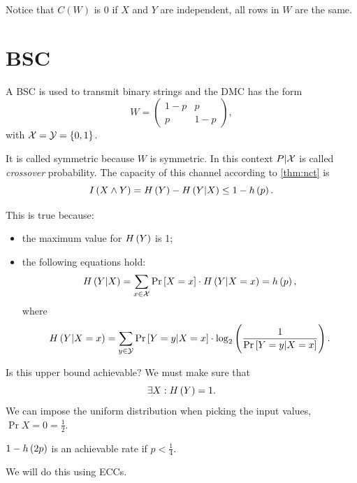 Notice that $C(W)$ is 0 if $X$ and $Y$ are independent, \ie all rows in $W$ are the same. 

\section{\acl{BSC}}

A \ac{BSC} is used to transmit binary strings and the \ac{DMC} has the form
\begin{equation*}
	W = 
	\begin{pmatrix}
		1-p & p \\
		p & 1-p
	\end{pmatrix},
\end{equation*}
with $\mathcal{X} = \mathcal{Y} = \{0,1\}$.

It is called symmetric because $W$ is symmetric.
In this context $P|\mathcal{X}$ is called \emph{crossover} probability.
The capacity of this channel according to \cref{thm:nct} is
\begin{equation*}
	I \left( {X \wedge Y} \right)
	=
	H\left({Y}\right) - H\left({Y|X}\right)
	\le
	1 - h\left({p}\right).
\end{equation*}

This is true because:
\begin{itemize}
	\item the maximum value for $H\left({Y}\right)$ is 1;
	\item the following equations hold:
		\begin{equation*}
			H\left({Y | X}\right) =
			\sum_{x \in \mathcal{X}} \mathop{\mathrm{Pr}}\limits_{} \left[ {X = x} \right] \cdot H\left({Y | X = x}\right) =
			h\left({p}\right),
		\end{equation*}
		where
		\begin{equation*}
			H\left({Y | X = x}\right) =
			\sum_{y \in \mathcal{Y}} \mathop{\mathrm{Pr}}\limits_{} \left[ {Y = y | X = x} \right] \cdot
			\log_2 \left( {\frac{1}{\mathop{\mathrm{Pr}}\limits_{} \left[ {Y = y | X = x} \right]}} \right).
		\end{equation*}
\end{itemize} 

Is this upper bound achievable? We must make sure that
\begin{equation*}
	\exists X : H\left({Y}\right) = 1.
\end{equation*}
We can impose the uniform distribution when picking the input values, \ie $\Pr{X = 0} = \frac{1}{2}$.

\begin{obs}
	$1-h\left({2p}\right)$ is an achievable rate if $p < \frac{1}{4}$.
\end{obs}
We will do this using \acp{ECC}.

